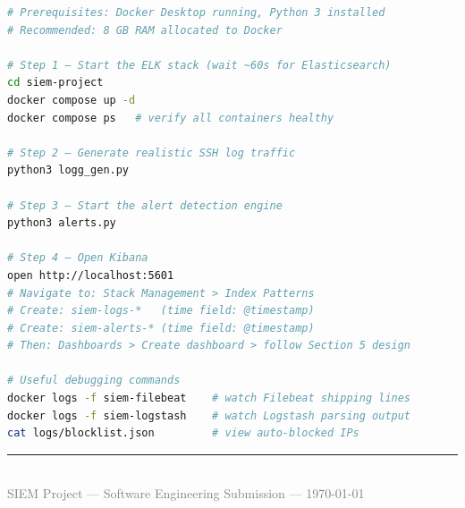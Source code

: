 \documentclass[12pt,a4paper]{article}
\begin{document}
\begin{lstlisting}[language=bash, caption=Full stack startup commands]
# Prerequisites: Docker Desktop running, Python 3 installed
# Recommended: 8 GB RAM allocated to Docker

# Step 1 — Start the ELK stack (wait ~60s for Elasticsearch)
cd siem-project
docker compose up -d
docker compose ps   # verify all containers healthy

# Step 2 — Generate realistic SSH log traffic
python3 logg_gen.py

# Step 3 — Start the alert detection engine
python3 alerts.py

# Step 4 — Open Kibana
open http://localhost:5601
# Navigate to: Stack Management > Index Patterns
# Create: siem-logs-*   (time field: @timestamp)
# Create: siem-alerts-* (time field: @timestamp)
# Then: Dashboards > Create dashboard > follow Section 5 design

# Useful debugging commands
docker logs -f siem-filebeat    # watch Filebeat shipping lines
docker logs -f siem-logstash    # watch Logstash parsing output
cat logs/blocklist.json         # view auto-blocked IPs
\end{lstlisting}

\vfill
\begin{center}
  \textcolor{accent}{\rule{0.6\linewidth}{0.4pt}}\\[0.6em]
  {\small\textcolor{gray}{SIEM Project — Software Engineering Submission — \today}}
\end{center}
\end{document}
